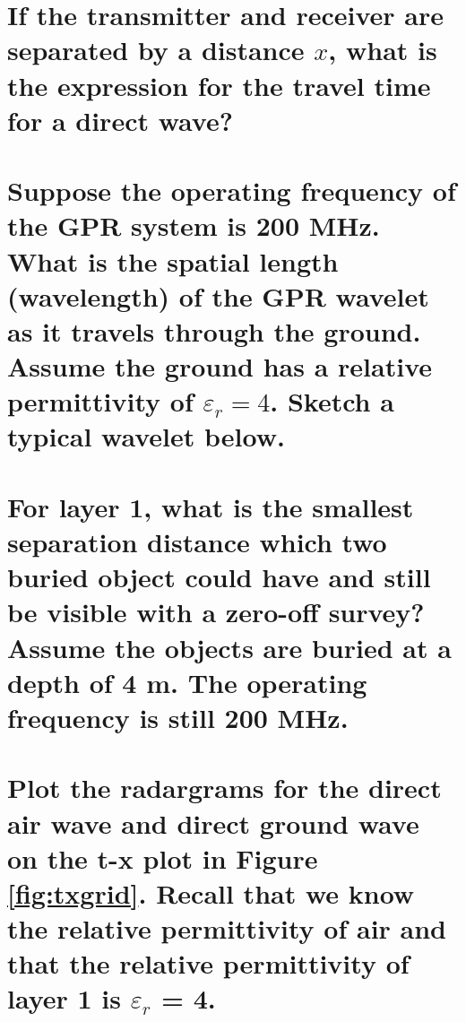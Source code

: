 \documentclass[twosides]{EOSC350Lab} %
\begin{document}

			\vspace*{60pt}

		\part{If the transmitter and receiver are separated by a distance $x$, what is the expression for the travel time for a direct wave?}


			\vspace*{60pt}


		\part{Suppose the operating frequency of the GPR system is 200 MHz. What is the spatial length (wavelength) of the GPR wavelet as it travels through the ground. Assume the ground has a relative permittivity of $\varepsilon_r = 4$. Sketch a typical wavelet below.}


			\vspace*{80pt}



		\part{For layer 1, what is the smallest separation distance which two buried object could have and still be visible with a zero-off survey? Assume the objects are buried at a depth of 4 m. The operating frequency is still 200 MHz.}




\pagebreak

		\part{Plot the radargrams for the direct air wave and direct ground wave on  the t-x plot in Figure \ref{fig:txgrid}. Recall that we know the relative permittivity of air and that the relative permittivity of layer 1 is $\varepsilon_r$ = 4. }
\end{document}
